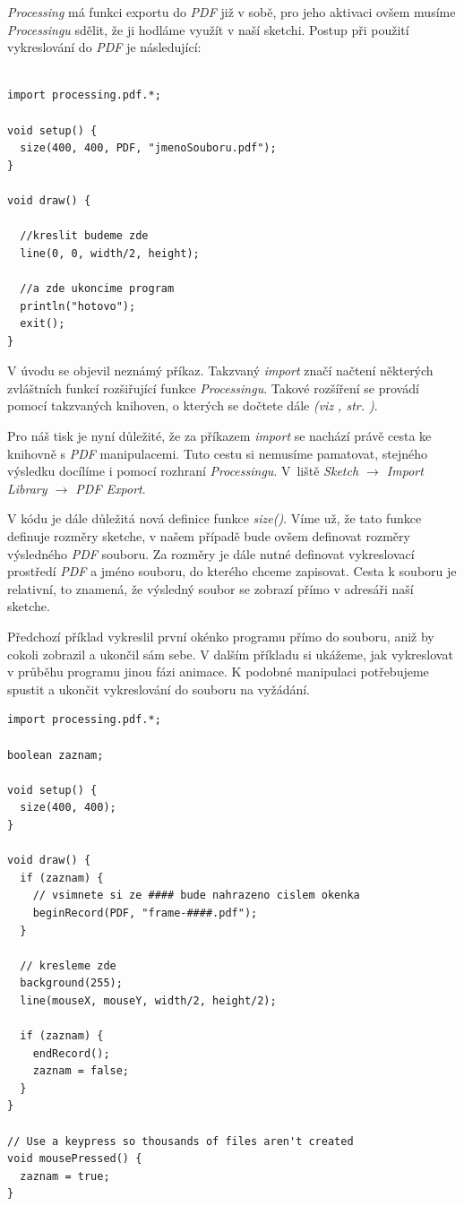 \documentclass[10pt,twoside=true,open=right,cleardoublepage=empty,chapterprefix=true]{scrbook}
\newcommand{\vyraz}[1]{\textit{\gls{#1}}\index{#1}\label{#1}}
\newcommand{\odkaz}[1]{\textit{(viz \nameref{#1}, str. \pageref*{#1})}}
\begin{document}
    {\em Processing} má funkci exportu do {\em PDF} již v sobě, pro jeho aktivaci ovšem musíme {\em Processingu} sdělit, že ji hodláme využít v naší sketchi.
    \newpage
 Postup při použití vykreslování do {\em PDF} je následující:
 
\begin{lstlisting} 

import processing.pdf.*;

void setup() {
  size(400, 400, PDF, "jmenoSouboru.pdf");
}

void draw() {

  //kreslit budeme zde
  line(0, 0, width/2, height);

  //a zde ukoncime program
  println("hotovo");
  exit();
}

\end{lstlisting}

V úvodu se objevil neznámý příkaz. Takzvaný \vyraz{import} značí načtení některých zvláštních funkcí rozšiřující funkce {\em Processingu}. Takové rozšíření se provádí pomocí takzvaných knihoven, o kterých se dočtete dále \odkaz{Knihovny}. 

Pro náš tisk je nyní důležité, že za příkazem \vyraz{import} se nachází právě cesta ke knihovně s {\em PDF} manipulacemi. Tuto cestu si nemusíme pamatovat, stejného výsledku docílíme i pomocí rozhraní {\em Processingu}. V~liště {\em Sketch $\rightarrow$ Import Library $\rightarrow$ PDF Export}.

V kódu je dále důležitá nová definice funkce \vyraz{size()}. Víme už, že tato funkce definuje rozměry sketche, v našem případě bude ovšem definovat rozměry výsledného {\em PDF} souboru. Za rozměry je dále nutné definovat vykreslovací prostředí {\em PDF} a jméno souboru, do kterého chceme zapisovat. Cesta k souboru je relativní, to znamená, že výsledný soubor se zobrazí přímo v adresáři naší sketche.

 Předchozí příklad vykreslil první okénko programu přímo do souboru, aniž by cokoli zobrazil a ukončil sám sebe. V dalším příkladu si ukážeme, jak vykreslovat v průběhu programu jinou fázi animace. K podobné manipulaci potřebujeme spustit a ukončit vykreslování do souboru na vyžádání.
 
\pagebreak
 
 \begin{lstlisting}
import processing.pdf.*;

boolean zaznam;

void setup() {
  size(400, 400);
}

void draw() {
  if (zaznam) {
    // vsimnete si ze #### bude nahrazeno cislem okenka
    beginRecord(PDF, "frame-####.pdf"); 
  }

  // kresleme zde
  background(255);
  line(mouseX, mouseY, width/2, height/2);

  if (zaznam) {
    endRecord();
	zaznam = false;
  }
}

// Use a keypress so thousands of files aren't created
void mousePressed() {
  zaznam = true;
}
 
 \end{lstlisting}
 
\end{document}
